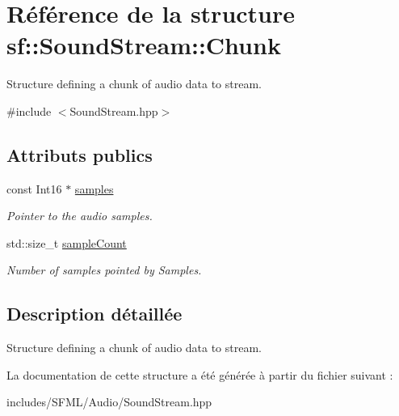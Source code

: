 \hypertarget{structsf_1_1SoundStream_1_1Chunk}{}\section{Référence de la structure sf\+:\+:Sound\+Stream\+:\+:Chunk}
\label{structsf_1_1SoundStream_1_1Chunk}


Structure defining a chunk of audio data to stream.  




{\ttfamily \#include $<$Sound\+Stream.\+hpp$>$}

\subsection*{Attributs publics}
\begin{DoxyCompactItemize}
\item 
\mbox{\label{structsf_1_1SoundStream_1_1Chunk_aa3b84d69adbe663a17a7671626076df4}} 
const Int16 $\ast$ \hyperlink{structsf_1_1SoundStream_1_1Chunk_aa3b84d69adbe663a17a7671626076df4}{samples}
\begin{DoxyCompactList}\small\item\em Pointer to the audio samples. \end{DoxyCompactList}\item 
\mbox{\label{structsf_1_1SoundStream_1_1Chunk_af47f5d94012acf8b11f056ba77aff97a}} 
std\+::size\+\_\+t \hyperlink{structsf_1_1SoundStream_1_1Chunk_af47f5d94012acf8b11f056ba77aff97a}{sample\+Count}
\begin{DoxyCompactList}\small\item\em Number of samples pointed by Samples. \end{DoxyCompactList}\end{DoxyCompactItemize}


\subsection{Description détaillée}
Structure defining a chunk of audio data to stream. 

La documentation de cette structure a été générée à partir du fichier suivant \+:\begin{DoxyCompactItemize}
\item 
includes/\+S\+F\+M\+L/\+Audio/Sound\+Stream.\+hpp\end{DoxyCompactItemize}
